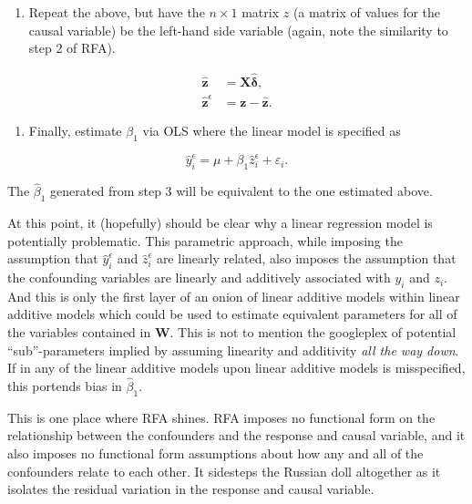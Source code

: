 \documentclass[11pt,]{article}
\providecommand{\tightlist}{%
\setlength{\itemsep}{0pt}\setlength{\parskip}{0pt}}
\begin{document}
\begin{enumerate}
\def\labelenumi{\arabic{enumi}.}
\setcounter{enumi}{1}
\tightlist
\item
  Repeat the above, but have the \(n \times 1\) matrix \(z\) (a matrix
  of values for the causal variable) be the left-hand side variable
  (again, note the similarity to step 2 of RFA).
\end{enumerate}

\[
\begin{aligned}
\hat{\mathbf{z}} & = \mathbf{X}\hat{\boldsymbol{\delta}}, \\
\hat{\mathbf{z}}^\epsilon & = \mathbf{z} -  \hat{\mathbf{z}}.
\end{aligned}\tag{9}
\]

\begin{enumerate}
\def\labelenumi{\arabic{enumi}.}
\setcounter{enumi}{2}
\tightlist
\item
  Finally, estimate \(\beta_1\) via OLS where the linear model is
  specified as
\end{enumerate}

\[\hat{y}_i^\epsilon = \mu + \beta_1\hat{z}_i^\epsilon + \varepsilon_i.\tag{10}\]

The \(\hat{\beta}_1\) generated from step 3 will be equivalent to the
one estimated above.

At this point, it (hopefully) should be clear why a linear regression
model is potentially problematic. This parametric approach, while
imposing the assumption that \(\hat{y}^\epsilon_i\) and
\(\hat{z}^\epsilon_i\) are linearly related, also imposes the assumption
that the confounding variables are linearly and additively associated
with \(y_i\) and \(z_i\). And this is only the first layer of an onion
of linear additive models within linear additive models which could be
used to estimate equivalent parameters for all of the variables
contained in \(\mathbf{W}\). This is not to mention the googleplex of
potential ``sub''-parameters implied by assuming linearity and
additivity \emph{all the way down}. If in any of the linear additive
models upon linear additive models is misspecified, this portends bias
in \(\hat{\beta}_1\).

This is one place where RFA shines. RFA imposes no functional form on
the relationship between the confounders and the response and causal
variable, and it also imposes no functional form assumptions about how
any and all of the confounders relate to each other. It sidesteps the
Russian doll altogether as it isolates the residual variation in the
response and causal variable.
\end{document}
